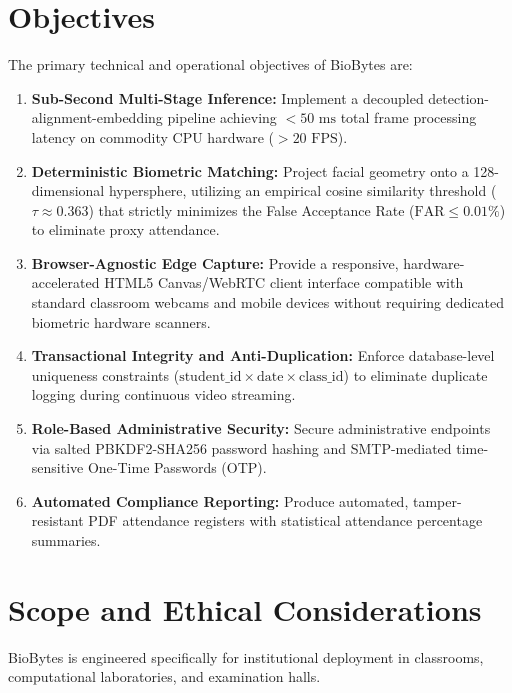 \documentclass[12pt,a4paper,oneside]{report}
\begin{document}
\section{Objectives}
The primary technical and operational objectives of BioBytes are:
\begin{enumerate}
    \item \textbf{Sub-Second Multi-Stage Inference:} Implement a decoupled detection-alignment-embedding pipeline achieving $< 50\text{ ms}$ total frame processing latency on commodity CPU hardware ($> 20\text{ FPS}$).
    \item \textbf{Deterministic Biometric Matching:} Project facial geometry onto a 128-dimensional hypersphere, utilizing an empirical cosine similarity threshold ($\tau \approx 0.363$) that strictly minimizes the False Acceptance Rate ($\text{FAR} \leq 0.01\%$) to eliminate proxy attendance.
    \item \textbf{Browser-Agnostic Edge Capture:} Provide a responsive, hardware-accelerated HTML5 Canvas/WebRTC client interface compatible with standard classroom webcams and mobile devices without requiring dedicated biometric hardware scanners.
    \item \textbf{Transactional Integrity and Anti-Duplication:} Enforce database-level uniqueness constraints ($\text{student\_id} \times \text{date} \times \text{class\_id}$) to eliminate duplicate logging during continuous video streaming.
    \item \textbf{Role-Based Administrative Security:} Secure administrative endpoints via salted PBKDF2-SHA256 password hashing and SMTP-mediated time-sensitive One-Time Passwords (OTP).
    \item \textbf{Automated Compliance Reporting:} Produce automated, tamper-resistant PDF attendance registers with statistical attendance percentage summaries.
\end{enumerate}

\section{Scope and Ethical Considerations}
BioBytes is engineered specifically for institutional deployment in classrooms, computational laboratories, and examination halls. 
\end{document}
